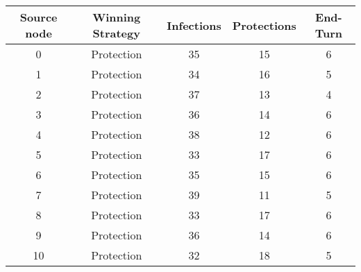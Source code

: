 \documentclass[results.tex]{subfiles}
\begin{document}
    \begin{center}
        \begin{tabular}{| c || c | c | c | c |}
            \hline
            {\bfseries Source node} & {\bfseries Winning Strategy} & {\bfseries Infections} & {\bfseries Protections}
            & {\bfseries End-Turn}
            \\  %
            \hline\hline
            0                       & Protection                   & 35                     & 15                      & 6                    \\
            \hline
            1                       & Protection                   & 34                     & 16                      & 5                    \\
            \hline
            2                       & Protection                   & 37                     & 13                      & 4                    \\
            \hline
            3                       & Protection                   & 36                     & 14                      & 6                    \\
            \hline
            4                       & Protection                   & 38                     & 12                      & 6                    \\
            \hline
            5                       & Protection                   & 33                     & 17                      & 6                    \\
            \hline
            6                       & Protection                   & 35                     & 15                      & 6                    \\
            \hline
            7                       & Protection                   & 39                     & 11                      & 5                    \\
            \hline
            8                       & Protection                   & 33                     & 17                      & 6                    \\
            \hline
            9                       & Protection                   & 36                     & 14                      & 6                    \\
            \hline
            10                      & Protection                   & 32                     & 18                      & 5                    \\

\end{tabular}
\end{center}
\end{document}
